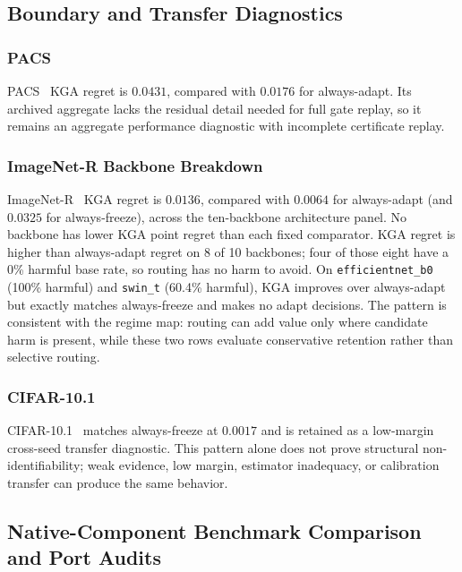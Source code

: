 \subsection{Boundary and Transfer Diagnostics}

\subsubsection{PACS}

PACS~\cite{li2017pacs} KGA regret is $0.0431$, compared with $0.0176$ for always-adapt. Its archived aggregate lacks
the residual detail needed for full gate replay, so it remains an aggregate performance diagnostic
with incomplete certificate replay.

\subsubsection{ImageNet-R Backbone Breakdown}

ImageNet-R~\cite{hendrycks2021manyfaces} KGA regret is $0.0136$, compared with $0.0064$ for always-adapt (and $0.0325$ for always-freeze), across the ten-backbone
architecture panel. No backbone has lower KGA point regret than each fixed comparator. KGA regret
is higher than always-adapt regret on 8 of 10 backbones; four of those eight have a 0\% harmful base
rate, so routing has no harm to avoid. On
\texttt{efficientnet\_b0} (100\% harmful) and \texttt{swin\_t} (60.4\% harmful), KGA improves over
always-adapt but exactly matches always-freeze and makes no adapt decisions. The pattern is
consistent with the regime map: routing can add value only where candidate harm is present, while
these two rows evaluate conservative retention rather than selective routing.

\subsubsection{CIFAR-10.1}

CIFAR-10.1~\cite{recht2019cifar10} matches always-freeze at $0.0017$ and is retained as a low-margin cross-seed transfer
diagnostic. This pattern alone does not prove structural non-identifiability; weak evidence, low
margin, estimator inadequacy, or calibration transfer can produce the same behavior.

\subsection{Native-Component Benchmark Comparison and Port Audits}
\label{app:historical-ports}
\label{app:baseline-ports}

